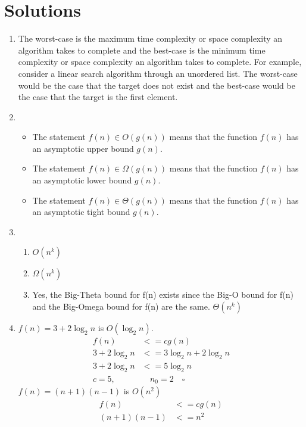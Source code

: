 \documentclass{book}
\begin{document}
\newpage

\section{Solutions}

\begin{enumerate}
  \item The worst-case is the maximum time complexity or space complexity an algorithm takes to complete and the best-case is the minimum time complexity or space complexity an algorithm takes to complete.
    For example, consider a linear search algorithm through an unordered list. The worst-case would be the case that the target does not exist and the best-case would be the case that the target is the first element.
  \item
    \begin{itemize}
      \item The statement $f(n) \in O(g(n))$ means that the function $f(n)$ has an asymptotic upper bound $g(n)$.
      \item The statement $f(n) \in \Omega(g(n))$ means that the function $f(n)$ has an asymptotic lower bound $g(n)$.
      \item The statement $f(n) \in \Theta(g(n))$ means that the function $f(n)$ has an asymptotic tight bound $g(n)$.
    \end{itemize}
  \item 
    \begin{enumerate}
      \item $O(n^k)$
      \item $\Omega(n^k)$
      \item Yes, the Big-Theta bound for f(n) exists since the Big-O bound for f(n) and the Big-Omega bound for f(n) are the same. $\Theta(n^k)$
    \end{enumerate}
  \item $f(n) = 3 + 2 \log_{2}{n}$ is $O(\log_{2}{n})$.
    \begin{align*}
      f(n) &<= cg(n) \\
      3 + 2 \log_{2}{n} &<= 3 \log_{2}{n} + 2 \log_{2}{n} \\
      3 + 2 \log_{2}{n} &<= 5 \log_{2}{n} \\ 
      c = 5, & \quad n_0 = 2 \quad \square
    \end{align*}
    $f(n) = (n + 1)(n - 1)$ is $O(n^{2})$
    \begin{align*}
      f(n) &<= cg(n) \\
      (n + 1)(n - 1) &<= n^2 \\

\end{align*}
\end{enumerate}
\end{document}
